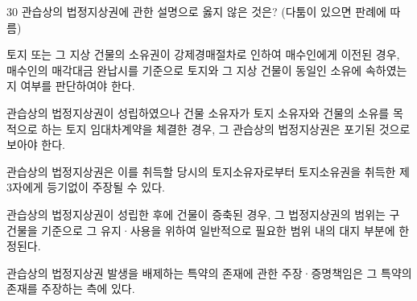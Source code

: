 \begin{question}{30}
관습상의 법정지상권에 관한 설명으로 옳지 않은 것은? (다툼이 있으면 판례에 따름)
\begin{choices}
  \item 토지 또는 그 지상 건물의 소유권이 강제경매절차로 인하여 매수인에게 이전된 경우, 매수인의 매각대금 완납시를 기준으로 토지와 그 지상 건물이 동일인 소유에 속하였는지 여부를 판단하여야 한다.
  \item 관습상의 법정지상권이 성립하였으나 건물 소유자가 토지 소유자와 건물의 소유를 목적으로 하는 토지 임대차계약을 체결한 경우, 그 관습상의 법정지상권은 포기된 것으로 보아야 한다.
  \item 관습상의 법정지상권은 이를 취득할 당시의 토지소유자로부터 토지소유권을 취득한 제3자에게 등기없이 주장될 수 있다.
  \item 관습상의 법정지상권이 성립한 후에 건물이 증축된 경우, 그 법정지상권의 범위는 구 건물을 기준으로 그 유지·사용을 위하여 일반적으로 필요한 범위 내의 대지 부분에 한정된다.
  \item 관습상의 법정지상권 발생을 배제하는 특약의 존재에 관한 주장·증명책임은 그 특약의 존재를 주장하는 측에 있다.
\end{choices}
\end{question}
